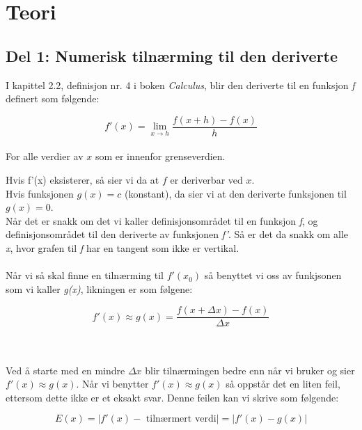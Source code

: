\chapter{Teori }

\section{Del 1: Numerisk tilnærming til den deriverte}

I kapittel 2.2, definisjon nr. 4 i boken \emph{Calculus}, blir den deriverte til en funksjon \emph{f} definert som følgende: 
\begin{center}

 \[f'(x)=\lim_{x \to h}\frac{f(x+h)-f(x)}{h}\]
\\For alle verdier av $x$ som er innenfor grenseverdien.
\end{center}
Hvis f'(x) eksisterer, så sier vi da at $f$ er deriverbar ved $x$. \cite{Calculus}
\\
Hvis funksjonen $g(x) = c$ (konstant), da sier vi at den deriverte funksjonen til $g(x) = 0$.\cite{Calculus}\\

Når det er snakk om det vi kaller definisjonsområdet til en funksjon \emph{f}, og definisjonsområdet til den deriverte av funksjonen \emph{f'}. Så er det da snakk om alle \emph{x}, hvor grafen til \emph{f} har en tangent som ikke er vertikal.\cite{Calculus} \\
\\
Når vi så skal finne en tilnærming til \(f'(x_{0})\) så benyttet vi oss av funkjsonen som vi kaller \emph{g(x)}, likningen er som følgene:
\begin{center}
    \[f'(x) \approx g(x)=\frac{f(x+ \Delta x)-f(x)}{\Delta x}\]
\end{center}\\
\\
Ved å starte med en mindre $\Delta x$ blir tilnærmingen bedre enn når vi bruker og sier $f'(x) \approx g(x)$. Når vi benytter $f'(x) \approx g(x)$ så oppstår det en liten feil, ettersom dette ikke er et eksakt svar. Denne feilen kan vi skrive som følgende:
\begin{center}
    \[E(x)= |f'(x) - \text{ tilnærmert verdi}| = |f'(x)-g(x)|\]
\end{center}






